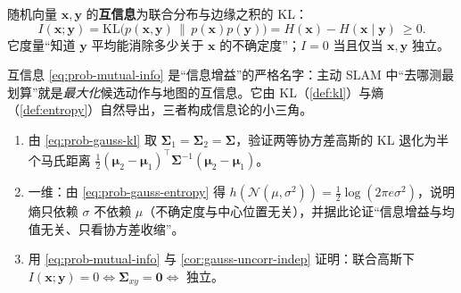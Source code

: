 \begin{definition}[互信息]\label{def:mutual-info}
随机向量 $\mathbf{x},\mathbf{y}$ 的\textbf{互信息}为联合分布与边缘之积的 KL：
\begin{equation}
  I(\mathbf{x};\mathbf{y})=\mathrm{KL}\big(p(\mathbf{x},\mathbf{y})\,\big\|\,p(\mathbf{x})p(\mathbf{y})\big)=H(\mathbf{x})-H(\mathbf{x}\mid\mathbf{y})\ \ge0.
  \label{eq:prob-mutual-info}
\end{equation}
它度量“知道 $\mathbf{y}$ 平均能消除多少关于 $\mathbf{x}$ 的不确定度”；$I=0$ 当且仅当 $\mathbf{x},\mathbf{y}$ 独立。
\end{definition}
\noindent 互信息 \cref{eq:prob-mutual-info} 是“信息增益”的严格名字：主动 SLAM 中“去哪测最划算”就是\emph{最大化}候选动作与地图的互信息。它由 KL（\cref{def:kl}）与熵（\cref{def:entropy}）自然导出，三者构成信息论的小三角。

\begin{practice}
\begin{enumerate}
  \item 由 \cref{eq:prob-gauss-kl} 取 $\boldsymbol{\Sigma}_1=\boldsymbol{\Sigma}_2=\boldsymbol{\Sigma}$，验证两等协方差高斯的 KL 退化为半个马氏距离 $\tfrac12(\boldsymbol{\mu}_2-\boldsymbol{\mu}_1)^\top\boldsymbol{\Sigma}^{-1}(\boldsymbol{\mu}_2-\boldsymbol{\mu}_1)$。
  \item 一维：由 \cref{eq:prob-gauss-entropy} 得 $h(\mathcal{N}(\mu,\sigma^2))=\tfrac12\log(2\pi e\sigma^2)$，说明熵只依赖 $\sigma$ 不依赖 $\mu$（不确定度与中心位置无关），并据此论证“信息增益与均值无关、只看协方差收缩”。
  \item 用 \cref{eq:prob-mutual-info} 与 \cref{cor:gauss-uncorr-indep} 证明：联合高斯下 $I(\mathbf{x};\mathbf{y})=0\Leftrightarrow\boldsymbol{\Sigma}_{xy}=\mathbf{0}\Leftrightarrow$ 独立。
\end{enumerate}
\end{practice}


